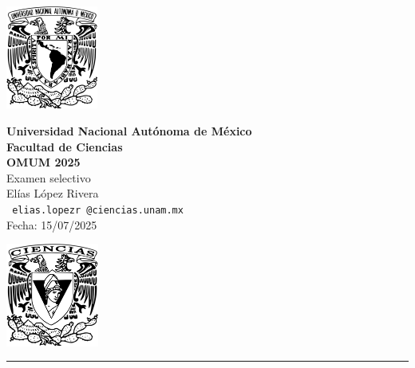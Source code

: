 \documentclass[11pt,letterpaper]{article}
\begin{document}

\begin{center}
    \begin{minipage}{3cm}
    	\begin{center}
    		\includegraphics[height=3.4cm]{logo_unam.png}
    	\end{center}
    \end{minipage}\hfill
    \begin{minipage}{10cm}
    	\begin{center}
    	\textbf{\large Universidad Nacional Autónoma de México}\\[0.1cm]
        \textbf{Facultad de Ciencias}\\[0.1cm]
        \textbf{OMUM 2025}\\[0.1cm]
        Examen selectivo\\[0.1cm]
         El\'ias L\'opez Rivera\\[0.1cm]
        \texttt{ elias.lopezr\,@ciencias.unam.mx }\\[0.1cm]
        Fecha:\,\,15/07/2025
    	\end{center}
    \end{minipage}\hfill
    \begin{minipage}{3cm}
    	\begin{center}
    		\includegraphics[height=3.4cm]{Logo_FC.png}
    	\end{center}
    \end{minipage}
\end{center}

\rule{17cm}{0.1mm}
\end{document}
